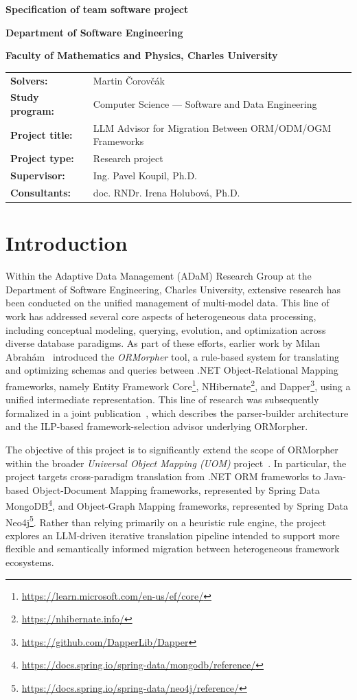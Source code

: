 \documentclass{article}
\title{\ProjectTitle}
\author{\StudentsFullName}
\def\ResearchProject{Research project}
\def\StudentsFullName{Martin Čorovčák}
\def\StudyProgram{Computer Science --- Software and Data Engineering}
\def\ProjectTitle{LLM Advisor for Migration Between ORM/ODM/OGM Frameworks}
\def\ProjectType{\ResearchProject}
\def\SupervisorFullName{Ing. Pavel Koupil, Ph.D.}
\def\ConsultantsFullName{doc. RNDr. Irena Holubová, Ph.D.}
\begin{document}
\centerline{\Large \textbf{Specification of team software project}}
\centerline{ \textbf{Department of Software Engineering}}
\centerline{ \textbf{Faculty of Mathematics and Physics, Charles University}}
\bigskip
{\noindent\begin{tabular*}{\textwidth}{ >{\raggedleft}m{4cm} l}
\textbf{Solvers:} & \StudentsFullName \\
\textbf{Study program:} & \StudyProgram \\[1em]
\textbf{Project title:} & \ProjectTitle \\
\textbf{Project type:} & \ProjectType \\[1em]
\textbf{Supervisor:} & \SupervisorFullName \\ 
\textbf{Consultants:} & \ConsultantsFullName \\
\end{tabular*}}

\section{Introduction}
Within the Adaptive Data Management (ADaM) Research Group at the Department of Software Engineering, Charles University, extensive research has been conducted on the unified management of multi-model data. This line of work has addressed several core aspects of heterogeneous data processing, including conceptual modeling, querying, evolution, and optimization across diverse database paradigms. As part of these efforts, earlier work by Milan Abrahám~\cite{ormorpherthesis} introduced the \textit{ORMorpher} tool, a rule-based system for translating and optimizing schemas and queries between .NET Object-Relational Mapping frameworks, namely Entity Framework Core\footnote{\url{https://learn.microsoft.com/en-us/ef/core/}}, NHibernate\footnote{\url{https://nhibernate.info/}}, and Dapper\footnote{\url{https://github.com/DapperLib/Dapper}}, using a unified intermediate representation. This line of research was subsequently formalized in a joint publication~\cite{ase2025}, which describes the parser-builder architecture and the ILP-based framework-selection advisor underlying ORMorpher.

The objective of this project is to significantly extend the scope of ORMorpher within the broader \emph{Universal Object Mapping (UOM)} project~\cite{uomrepo}. In particular, the project targets cross-paradigm translation from .NET ORM frameworks to Java-based Object-Document Mapping frameworks, represented by Spring Data MongoDB\footnote{\url{https://docs.spring.io/spring-data/mongodb/reference/}}, and Object-Graph Mapping frameworks, represented by Spring Data Neo4j\footnote{\url{https://docs.spring.io/spring-data/neo4j/reference/}}. Rather than relying primarily on a heuristic rule engine, the project explores an LLM-driven iterative translation pipeline intended to support more flexible and semantically informed migration between heterogeneous framework ecosystems.
\end{document}
